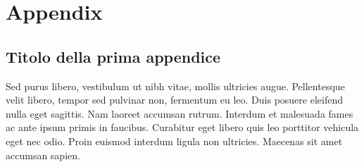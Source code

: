 \documentclass[target=mst]{thud}
\theoremstyle{definition}
\theoremstyle{plain}
\theoremstyle{remark}
\begin{document}
\appendix

\part{Appendix}

\chapter{Titolo della prima appendice}
Sed purus libero, vestibulum ut nibh vitae, mollis ultricies augue. Pellentesque velit libero, tempor sed
pulvinar non, fermentum eu leo. Duis posuere eleifend nulla eget sagittis. Nam laoreet accumsan rutrum.
Interdum et malesuada fames ac ante ipsum primis in faucibus. Curabitur eget libero quis leo porttitor
vehicula eget nec odio. Proin euismod interdum ligula non ultricies. Maecenas sit amet accumsan sapien.

\backmatter%




\end{document}
